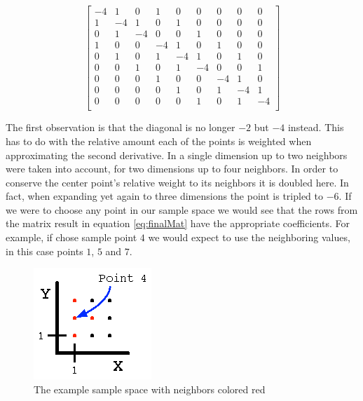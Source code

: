 \documentclass[authoryearcitations]{UoYCSproject}
\begin{document}
\begin{equation}
                       \begin{bmatrix}
                                        -4 & 1 & 0 & 1 & 0 & 0 & 0 & 0 & 0 \\
                                        1 & -4 & 1 & 0 & 1 & 0 & 0 & 0 & 0 \\ 
                                        0 & 1 & -4 & 0 & 0 & 1 & 0 & 0 & 0 \\
                                        1 & 0 & 0 & -4 & 1 & 0 & 1 & 0 & 0 \\
                                        0 & 1 & 0 & 1 & -4 & 1 & 0 & 1 & 0 \\
                                        0 & 0 & 1 & 0 & 1 & -4 & 0 & 0 & 1 \\
                                        0 & 0 & 0 & 1 & 0 & 0 & -4 & 1 & 0 \\
                                        0 & 0 & 0 & 0 & 1 & 0 & 1 & -4 & 1 \\
                                        0 & 0 & 0 & 0 & 0 & 1 & 0 & 1 & -4 \\
                                      \end{bmatrix}
\label{eq:finalMat}
\end{equation}

The first observation is that the diagonal is no longer $-2$ but $-4$ instead. This has to do with the relative 
amount each of the points is weighted when approximating the second derivative. In a single dimension up to two
neighbors were taken into account, for two dimensions up to four neighbors. In order to conserve the center point's
relative weight to its neighbors it is doubled here. In fact, when expanding yet again to three dimensions the 
point is tripled to $-6$. 
If we were to choose any point in our sample space we would see that the rows from the matrix result in equation 
\ref{eq:finalMat} have the appropriate coefficients. For example, if chose sample point $4$ we would expect to 
use the neighboring values, in this case points $1$, $5$ and $7$. 

\begin{figure}[!h]
\centering
\includegraphics[scale=2.0]{figures/9PointExample.eps}
\caption{The example sample space with neighbors colored red}
\label{9PointExample}
\end{figure}
\end{document}
